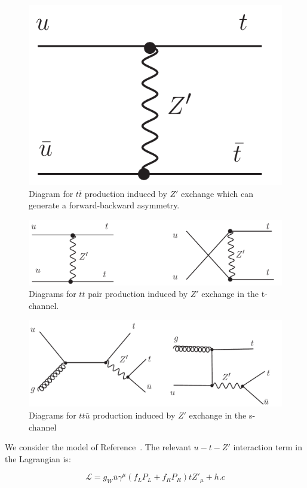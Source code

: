 \begin{figure}[htb]
\begin{center}
\includegraphics[width=0.35\linewidth, height=0.25\linewidth]{figs/ttbar_Z.pdf}
\caption{ Diagram for $t\bar{t}$ production induced by $Z'$ exchange which
can generate a forward-backward asymmetry. \label{fig:ttbar}}
\end{center}
\end{figure}

\begin{figure}[htb]
\begin{center}
\includegraphics[width=0.7\linewidth, height=0.2\linewidth]{figs/sstop1.pdf}
\caption{ Diagrams for $tt$ pair production induced by $Z'$ exchange in the t-channel. 
\label{fig:tchannel}}
\end{center}
\end{figure}

\begin{figure}[htb]
\begin{center}
\includegraphics[width=0.7\linewidth, height=0.25\linewidth]{figs/sstop2.pdf}
\caption{ Diagrams for $tt\bar{u}$ production induced by $Z'$ exchange in the s-channel 
\label{fig:schannel}}
\end{center}
\end{figure}


We consider the model of Reference~\cite{berger}.  
The relevant $u-t-Z'$ interaction term in the Lagrangian is:

\begin{equation}
\label{eqn:L_berger}
  \mathcal{L} = g_W \bar{u} \gamma^\mu (f_L P_L + f_R P_R)tZ'_\mu + h.c
\end{equation}

